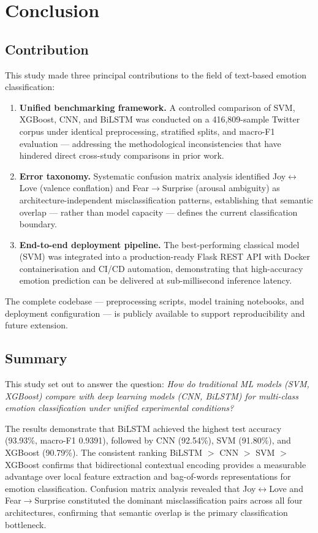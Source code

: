 \section{Conclusion}
\label{sec:conclusion}

\subsection{Contribution}

This study made three principal contributions to the field of text-based emotion classification:

\begin{enumerate}[nosep]
    \item \textbf{Unified benchmarking framework.} A controlled comparison of SVM, XGBoost, CNN, and BiLSTM was conducted on a 416,809-sample Twitter corpus under identical preprocessing, stratified splits, and macro-F1 evaluation --- addressing the methodological inconsistencies that have hindered direct cross-study comparisons in prior work.
    \item \textbf{Error taxonomy.} Systematic confusion matrix analysis identified Joy$\leftrightarrow$Love (valence conflation) and Fear$\rightarrow$Surprise (arousal ambiguity) as architecture-independent misclassification patterns, establishing that semantic overlap --- rather than model capacity --- defines the current classification boundary.
    \item \textbf{End-to-end deployment pipeline.} The best-performing classical model (SVM) was integrated into a production-ready Flask REST API with Docker containerisation and CI/CD automation, demonstrating that high-accuracy emotion prediction can be delivered at sub-millisecond inference latency.
\end{enumerate}

The complete codebase --- preprocessing scripts, model training notebooks, and deployment configuration --- is publicly available to support reproducibility and future extension.

\subsection{Summary}

This study set out to answer the question: \emph{How do traditional ML models (SVM, XGBoost) compare with deep learning models (CNN, BiLSTM) for multi-class emotion classification under unified experimental conditions?}

The results demonstrate that BiLSTM achieved the highest test accuracy (93.93\%, macro-F1 0.9391), followed by CNN (92.54\%), SVM (91.80\%), and XGBoost (90.79\%). The consistent ranking BiLSTM $>$ CNN $>$ SVM $>$ XGBoost confirms that bidirectional contextual encoding provides a measurable advantage over local feature extraction and bag-of-words representations for emotion classification. Confusion matrix analysis revealed that Joy$\leftrightarrow$Love and Fear$\rightarrow$Surprise constituted the dominant misclassification pairs across all four architectures, confirming that semantic overlap is the primary classification bottleneck.

